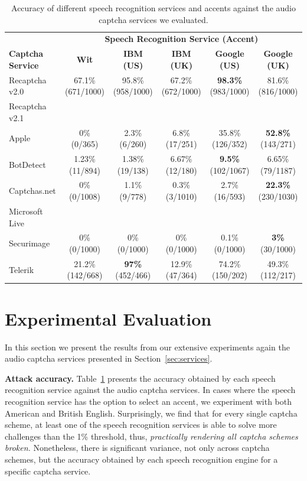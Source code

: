 \begin{table}[h]
\centering
\caption{Accuracy of different speech recognition services and accents against the audio captcha services we evaluated.}
\begin{tabular}{lccccc}
\toprule
&\multicolumn{5}{c}{\textbf{Speech Recognition Service (Accent)}}\\
\cmidrule{2-6}
\textbf{Captcha Service}& \textbf{Wit}& \textbf{IBM (US)} & \textbf{ IBM (UK)} & \textbf{Google (US)} & \textbf{Google (UK)} \\
\hline
Recaptcha v2.0 & 67.1\% (671/1000) & 95.8\% (958/1000) & 67.2\% (672/1000) & \textbf{98.3\%} (983/1000) & 81.6\% (816/1000) \\
\rowcolor{Gray}
Recaptcha v2.1 &  &  &  &  & \\
Apple  & 0\% (0/365)  & 2.3\% (6/260) & 6.8\% (17/251) & 35.8\% (126/352) & \textbf{52.8\%} (143/271) \\
\rowcolor{Gray}
BotDetect  & 1.23\% (11/894)  & 1.38\% (19/138) & 6.67\% (12/180) & \textbf{9.5\%} (102/1067)  & 6.65\% (79/1187) \\
Captchas.net  & 0\% (0/1008) & 1.1\% (9/778)  & 0.3\% (3/1010)  & 2.7\% (16/593) & \textbf{22.3\%} (230/1030) \\
\rowcolor{Gray}
Microsoft Live & &  &  & & \\
Securimage  & 0\% (0/1000)  & 0\% (0/1000) & 0\% (0/1000) & 0.1\% (0/1000) & \textbf{3\%} (30/1000) \\
\rowcolor{Gray}
Telerik  & 21.2\% (142/668)  & \textbf{97\%} (452/466) & 12.9\% (47/364) & 74.2\% (150/202) & 49.3\% (112/217) \\
\bottomrule
\end{tabular}
\label{tab:combinations}
\end{table}

\section{Experimental Evaluation}
\label{sec:evaluation}

In this section we present the results from our extensive experiments again 
the audio captcha services presented in Section~\ref{sec:services}.

\textbf{Attack accuracy.} Table~\ref{tab:combinations} presents the accuracy obtained by each speech recognition service 
against the audio captcha services. In cases where the speech recognition service has the option to select an accent,
we experiment with both American and British English. Surprisingly, we find that for every single captcha scheme, at least
one of the speech recognition services is able to solve more challenges than the 1\% threshold, thus, \emph{practically 
rendering all captcha schemes broken.} Nonetheless, there is significant variance, not only across captcha schemes, but
the accuracy obtained by each speech recognition engine for a specific captcha service. 

